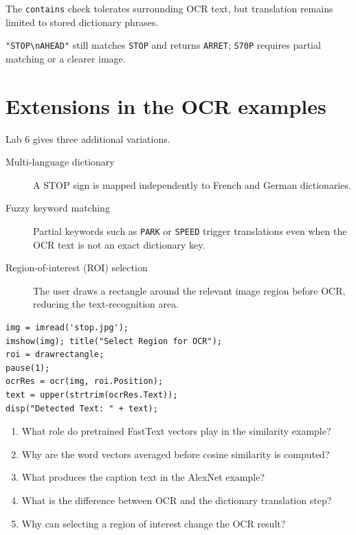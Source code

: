 The \texttt{contains} check tolerates surrounding OCR text, but translation remains limited to stored dictionary phrases.

\begin{workedexample}
\texttt{"STOP\textbackslash nAHEAD"} still matches \texttt{STOP} and returns \texttt{ARRET}; \texttt{S70P} requires partial matching or a clearer image.
\end{workedexample}

\section{Extensions in the OCR examples}

Lab 6 gives three additional variations.

\begin{description}
  \item[Multi-language dictionary] A STOP sign is mapped independently to French and German dictionaries.
  \item[Fuzzy keyword matching] Partial keywords such as \texttt{PARK} or \texttt{SPEED} trigger translations even when the OCR text is not an exact dictionary key.
  \item[Region-of-interest (ROI) selection] The user draws a rectangle around the relevant image region before OCR, reducing the text-recognition area.
\end{description}

\begin{lstlisting}[style=mlmatlab]
img = imread('stop.jpg');
imshow(img); title("Select Region for OCR");
roi = drawrectangle;
pause(1);
ocrRes = ocr(img, roi.Position);
text = upper(strtrim(ocrRes.Text));
disp("Detected Text: " + text);
\end{lstlisting}



\begin{quickcheck}
\begin{enumerate}
  \item What role do pretrained FastText vectors play in the similarity example?
  \item Why are the word vectors averaged before cosine similarity is computed?
  \item What produces the caption text in the AlexNet example?
  \item What is the difference between OCR and the dictionary translation step?
  \item Why can selecting a region of interest change the OCR result?
\end{enumerate}
\end{quickcheck}


